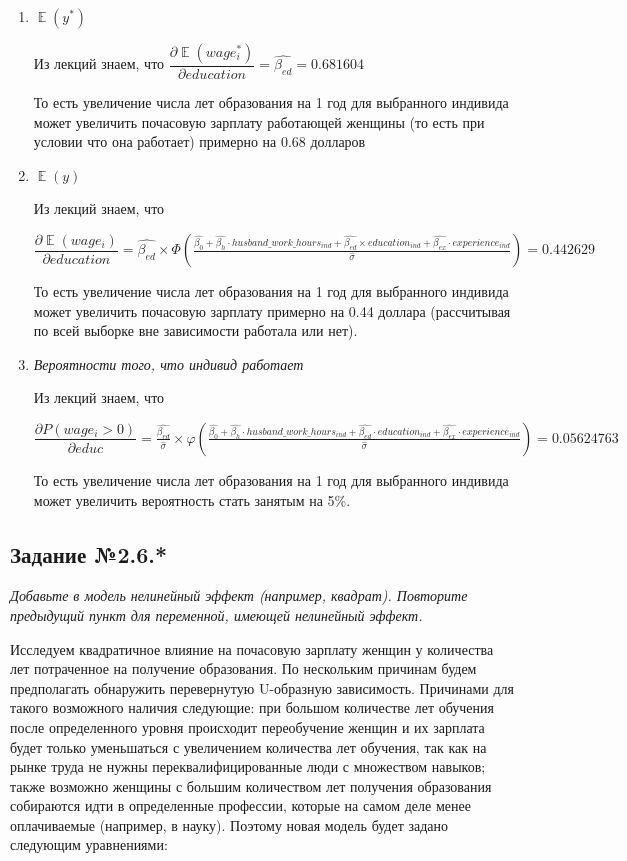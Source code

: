 \documentclass[a4paper,12pt]{article}
\DeclareMathOperator{\EX}{\mathbb{E}}%
\begin{document}
\begin{enumerate}[label=\Alph*)]
	\item $\EX(y^*)$
	
	Из лекций знаем, что $\dfrac{\partial \EX (wage_i^*)}{\partial education}=\hat{\beta_{ed}} = 0.681604$
	
	То есть увеличение числа лет образования на 1 год для выбранного индивида может увеличить почасовую зарплату работающей женщины (то есть при условии что она работает) примерно на 0.68 долларов
	
	\item $\EX(y)$
	
	
	Из лекций знаем, что 
	
	$\dfrac{\partial \EX (wage_i)}{\partial education}=\hat{\beta_{ed}}\times \Phi \left(\frac{\hat{\beta_0}+\hat{\beta_h} \cdot husband\_work\_hours_{ind}  +\hat{\beta_{ed} }\times education_{ind}+ \hat{\beta_{ex} }\cdot experience_{ind}}{\hat{\sigma} }\right)  = 0.442629$
	
	То есть увеличение числа лет образования на 1 год для выбранного индивида может увеличить почасовую зарплату примерно на 0.44 доллара (рассчитывая по всей выборке вне зависимости работала или нет).
	
	\item \textit{Вероятности того, что индивид работает}
	
	Из лекций знаем, что 
	
	
	$\dfrac{\partial  P(wage_i>0)}{\partial educ}=\frac{\hat{\beta_{ed}}}{\hat{\sigma}}\times\varphi \left(\frac{\hat{\beta_0}+\hat{\beta_h} \cdot husband\_work\_hours_{ind}  +\hat{\beta_{ed} }\cdot education_{ind}+ \hat{\beta_{ex} }\cdot experience_{ind}}{\hat{\sigma} }\right)  = 0.05624763$
	
	То есть увеличение числа лет образования на 1 год для выбранного индивида может увеличить вероятность стать занятым на 5\%.
	
\end{enumerate}




\subsection{Задание №2.6.*}
\textit{Добавьте в модель нелинейный эффект (например, квадрат). Повторите
предыдущий пункт для переменной, имеющей нелинейный эффект.}

\vspace{0.2cm}


Исследуем квадратичное влияние на почасовую зарплату женщин у количества лет потраченное на получение образования. По нескольким причинам будем предполагать обнаружить перевернутую U-образную зависимость. Причинами для такого возможного наличия следующие: при большом количестве лет обучения после определенного уровня происходит переобучение женщин и их зарплата будет только уменьшаться с увеличением количества лет обучения, так как на рынке труда не нужны переквалифицированные люди с множеством навыков; также возможно женщины с большим количеством лет получения образования собираются идти в определенные профессии, которые на самом деле менее оплачиваемые (например, в науку). Поэтому новая модель  будет задано следующим уравнениями:
\end{document}

